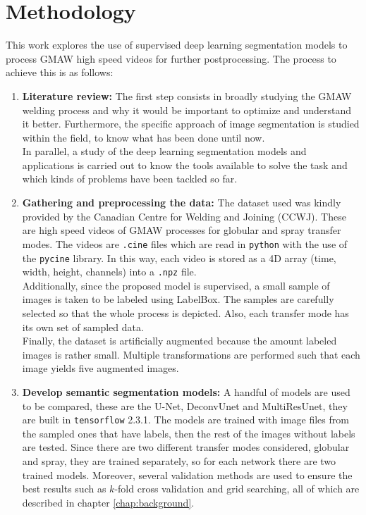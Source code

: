 \chapter{Methodology}\label{chap:methodology}

This work explores the use of supervised deep learning segmentation models to process GMAW high speed videos for further postprocessing. The process to achieve this is as follows:

\begin{enumerate}
    \item \textbf{Literature review:} The first step consists in broadly studying the GMAW welding process and why it would be important to optimize and understand it better. Furthermore, the specific approach of image segmentation is studied within the field, to know what has been done until now.\\ 
    
    In parallel, a study of the deep learning segmentation models and applications is carried out to know the tools available to solve the task and which kinds of problems have been tackled so far.\\
    
    \item \textbf{Gathering and preprocessing the data:}
    The dataset used was kindly provided by the Canadian Centre for Welding and Joining (CCWJ). These are high speed videos of GMAW processes for globular and spray transfer modes. The videos are \texttt{.cine} files which are read in \texttt{python} with the use of the \texttt{pycine} library. In this way, each video is stored as a 4D array (time, width, height, channels) into a \texttt{.npz} file.\\
    
    Additionally, since the proposed model is supervised, a small sample of images is taken to be labeled using LabelBox. The samples are carefully selected so that the whole process is depicted. Also, each transfer mode has its own set of sampled data.\\
    
    Finally, the dataset is artificially augmented because the amount labeled images is rather small. Multiple transformations are performed such that each image yields five augmented images.\\
    
    \item \textbf{Develop semantic segmentation models:}
    A handful of models are used to be compared, these are the U-Net, DeconvUnet and MultiResUnet, they are built in \texttt{tensorflow} 2.3.1. The models are trained with image files from the sampled ones that have labels, then the rest of the images without labels are tested. Since there are two different transfer modes considered, globular and spray, they are trained separately, so for each network there are two trained models. Moreover, several validation methods are used to ensure the best results such as $k$-fold cross validation and grid searching, all of which are described in chapter \ref{chap:background}.\\
    

\end{enumerate}
